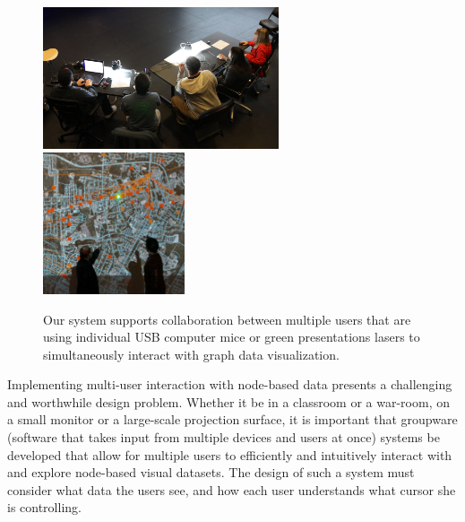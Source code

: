 \documentclass[runningheads,a4paper]{llncs}
\begin{document}
\begin{figure}[t]
 \centering
 \includegraphics[width=0.62\textwidth]{images/synenv_images/cs_students_4.jpg}
 \includegraphics[width=0.372\textwidth]{images/synenv_square.jpg}%
\vspace{-0.1in}
 \caption{\label{figure:using_mice_and_lasers} Our system supports
   collaboration between multiple users that are using individual USB
   computer mice or green presentations lasers to
   simultaneously interact with graph data visualization.
\vspace{-0.1in}
}
\end{figure}


Implementing multi-user interaction with node-based data
presents a challenging and worthwhile design problem.
Whether it be in a classroom or a war-room, on a small monitor or a large-scale projection surface,
it is important that groupware (software that takes input from multiple devices and users at once)
systems be developed
that allow for multiple users to efficiently and intuitively interact with and explore
node-based visual datasets.
The design of such a system must consider
what data the users see,
and how each user understands what cursor she is controlling.
% 
\end{document}

